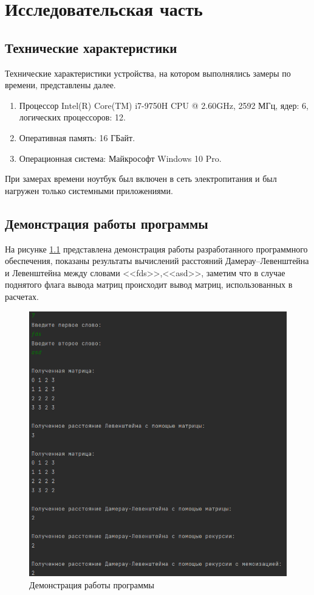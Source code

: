 \chapter{Исследовательская часть}

\section{Технические характеристики}

Технические характеристики устройства, на котором выполнялись замеры по времени, представлены далее.

\begin{enumerate}
	\item Процессор	Intel(R) Core(TM) i7-9750H CPU @ 2.60GHz, 2592 МГц, ядер: 6, логических процессоров: 12.
	\item Оперативная память: 16 ГБайт.
	\item Операционная система: Майкрософт Windows 10 Pro.
\end{enumerate}

При замерах времени ноутбук был включен в сеть электропитания и был нагружен только системными приложениями.

\section{Демонстрация работы программы}

На рисунке \ref{img:demonstration} представлена демонстрация работы разработанного программного обеспечения, 
показаны результаты вычислений расстояний Дамерау--Левенштейна и Левенштейна между словами <<fds>>,<<asd>>, заметим
что в случае поднятого флага вывода матриц происходит вывод матриц, использованных в расчетах.
\clearpage
\begin{figure}[H]
	\centering
	\includegraphics[height=0.7\textheight]{../img/programm_work.png}
	\caption{Демонстрация работы программы}
	\label{img:demonstration}
\end{figure}

